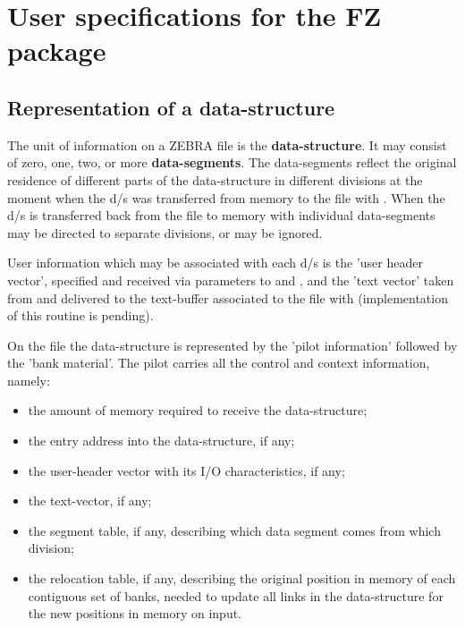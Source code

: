 \chapter{User specifications for the FZ package}

\section{Representation of a data-structure}

The unit of information on a ZEBRA file is the
\textbf{data-structure}.
It may consist of zero, one, two, or more
\textbf{data-segments}.
The data-segments reflect the original residence of different
parts of the data-structure in different divisions at the
moment when the d/s was transferred from memory to the file with
.
When the d/s is transferred back from the file to memory with 
individual data-segments may be directed to separate divisions,
or may be ignored.

User information which may be associated with each d/s is
the 'user header vector',
specified and received via parameters to  and ,
and the 'text vector' taken from and delivered to the text-buffer
associated to the file with  (implementation of this routine
is pending).

On the file the data-structure is represented
by the 'pilot information' followed by the 'bank material'.
The pilot carries all the control and context information,
namely:

\begin{itemize}
\item the amount of memory required to receive the data-structure;
\item the entry address into the data-structure, if any;
\item the user-header vector with its I/O characteristics, if any;
\item the text-vector, if any;
\item the segment table, if any, describing which data segment comes
      from which division;
\item the relocation table, if any, describing the original position
      in memory of each contiguous set of banks, needed to update
      all links in the data-structure for the new positions in
      memory on input.
\end{itemize}

